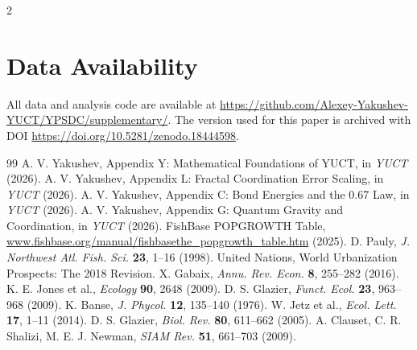 \documentclass[11pt,a4paper]{article}
\begin{document}
\begin{multicols}{2}
		\section*{Data Availability}
		
		All data and analysis code are available at \url{https://github.com/Alexey-Yakushev-YUCT/YPSDC/supplementary/}. The version used for this paper is archived with DOI \url{https://doi.org/10.5281/zenodo.18444598}.
		
		\begin{thebibliography}{99}
			 A. V. Yakushev, Appendix Y: Mathematical Foundations of YUCT, in \emph{YUCT} (2026).
			 A. V. Yakushev, Appendix L: Fractal Coordination Error Scaling, in \emph{YUCT} (2026).
			 A. V. Yakushev, Appendix C: Bond Energies and the 0.67 Law, in \emph{YUCT} (2026).
			 A. V. Yakushev, Appendix G: Quantum Gravity and Coordination, in \emph{YUCT} (2026).
			 FishBase POPGROWTH Table, \url{www.fishbase.org/manual/fishbasethe_popgrowth_table.htm} (2025).
			 D. Pauly, \emph{J. Northwest Atl. Fish. Sci.} \textbf{23}, 1–16 (1998).
			 United Nations, World Urbanization Prospects: The 2018 Revision.
			 X. Gabaix, \emph{Annu. Rev. Econ.} \textbf{8}, 255–282 (2016).
			 K. E. Jones et al., \emph{Ecology} \textbf{90}, 2648 (2009).
			 D. S. Glazier, \emph{Funct. Ecol.} \textbf{23}, 963–968 (2009).
			 K. Banse, \emph{J. Phycol.} \textbf{12}, 135–140 (1976).
			 W. Jetz et al., \emph{Ecol. Lett.} \textbf{17}, 1–11 (2014).
			 D. S. Glazier, \emph{Biol. Rev.} \textbf{80}, 611–662 (2005).
			 A. Clauset, C. R. Shalizi, M. E. J. Newman, \emph{SIAM Rev.} \textbf{51}, 661–703 (2009).
		\end{thebibliography}
		
	\end{multicols}
\end{document}
